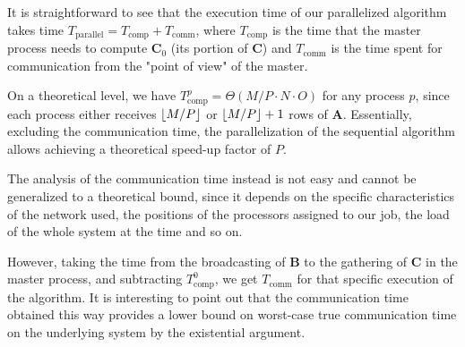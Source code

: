 It is straightforward to see that the execution time of our parallelized algorithm takes time $T_{\text{parallel}} = T_{\text{comp}} + T_{\text{comm}}$, where $T_{\text{comp}}$ is the time that the master process needs to compute $\textbf{C}_0$ (its portion of $\textbf{C}$) and $T_{\text{comm}}$ is the time spent for communication from the "point of view" of the master.

On a theoretical level, we have $T_{\text{comp}}^p = \Theta(M/P \cdot N \cdot O)$ for any process $p$, since each process either receives $\floor*{M/P}$ or $\floor*{M/P} + 1$ rows of $\textbf{A}$. Essentially, excluding the communication time, the parallelization of the sequential algorithm allows achieving a theoretical speed-up factor of $P$.

The analysis of the communication time instead is not easy and cannot be generalized to a theoretical bound, since it depends on the specific characteristics of the network used, the positions of the processors assigned to our job, the load of the whole system at the time and so on.

However, taking the time from the broadcasting of \textbf{B} to the gathering of \textbf{C} in the master process, and subtracting $T_{\text{comp}}^0$, we get $T_{\text{comm}}$ for that specific execution of the algorithm. It is interesting to point out that the communication time obtained this way provides a lower bound on worst-case true communication time on the underlying system by the existential argument.